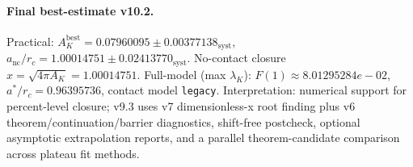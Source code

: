 \paragraph{Final best-estimate v10.2.}
Practical: $A_K^{\mathrm{best}} = 0.07960095 \pm 0.00377138_{\mathrm{syst}}$, $a_{\mathrm{nc}}/r_c = 1.00014751 \pm 0.02413770_{\mathrm{syst}}$.
No-contact closure $x = \sqrt{4\pi A_K} = 1.00014751$.
Full-model (max $\lambda_K$): $F(1) \approx 8.01295284e-02$, $a^*/r_c = 0.96395736$, contact model \texttt{legacy}.
Interpretation: numerical support for percent-level closure; v9.3 uses v7 dimensionless-x root finding plus v6 theorem/continuation/barrier diagnostics, shift-free postcheck, optional asymptotic extrapolation reports, and a parallel theorem-candidate comparison across plateau fit methods.
